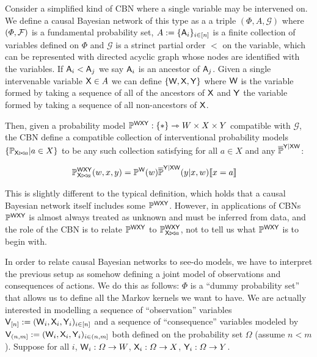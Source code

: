 Consider a simplified kind of CBN where a single variable may be intervened on. We define a causal Bayesian network of this type as a a triple $(\Phi,A,\mathcal{G})$ where $(\Phi,\mathcal{F})$ is a fundamental probability set, $A:=\{\mathsf{A}_i\}_{i\in [n]}$ is a finite collection of variables defined on $\Phi$ and $\mathcal{G}$ is a strinct partial order $<$ on the variable, which can be represented with directed acyclic graph whose nodes are identified with the variables. If $\mathsf{A}_i<\mathsf{A}_j$ we say $\mathsf{A}_i$ is an ancestor of $\mathsf{A}_j$. Given a single intervenable variable $\mathsf{X}\in A$ we can define $\{\mathsf{W},\mathsf{X},\mathsf{Y}\}$ where $\mathsf{W}$ is the variable formed by taking a sequence of all of the ancestors of $\mathsf{X}$ and $\mathsf{Y}$ the variable formed by taking a sequence of all non-ancestors of $\mathsf{X}$.

Then, given a probability model $\mathbb{P}^{\mathsf{WXY}}:\{*\}\rightarrowtriangle W\times X\times Y$ compatible with $\mathcal{G}$, the CBN define a compatible collection of interventional probability models $\{\mathbb{P}_{\mathsf{X}\bowtie a}|a\in X\}$ to be any such collection satisfying for all $a\in X$ and any $\overline{\mathbb{P}}^{\mathsf{Y}|\mathsf{XW}}$:

\begin{align}
    \mathbb{P}_{\mathsf{X}\bowtie a}^{\mathsf{W}\mathsf{X}\mathsf{Y}}(w,x,y) &= \mathbb{P}^{\mathsf{W}}(w)\overline{\mathbb{P}}^{\mathsf{Y}|\mathsf{XW}}(y|x,w)\llbracket x=a \rrbracket\label{eq:truncated_fac2}
\end{align}

This is slightly different to the typical definition, which holds that a causal Bayesian network itself includes some $\mathbb{P}^{\mathsf{WXY}}$. However, in applications of CBNs $\mathbb{P}^{\mathsf{WXY}}$ is almost always treated as unknown and must be inferred from data, and the role of the CBN is to relate $\mathbb{P}^{\mathsf{WXY}}$ to $\mathbb{P}_{\mathsf{X}\bowtie a}^{\mathsf{W}\mathsf{X}\mathsf{Y}}$, not to tell us what $\mathbb{P}^{\mathsf{WXY}}$ is to begin with.

In order to relate causal Bayesian networks to see-do models, we have to interpret the previous setup as somehow defining a joint model of observations and consequences of actions. We do this as follows: $\Phi$ is a ``dummy probability set'' that allows us to define all the Markov kernels we want to have. We are actually interested in modelling a sequence of ``observation'' variables $\mathsf{V}_{[n]}:=(\mathsf{W}_i,\mathsf{X}_i,\mathsf{Y}_i)_{i\in [n]}$ and a sequence of ``consequence'' variables modeled by $\mathsf{V}_{(n,m]}:=(\mathsf{W}_i,\mathsf{X}_i,\mathsf{Y}_i)_{i\in (n,m]}$ both defined on the probability set $\Omega$ (assume $n<m$). Suppose for all $i$, $\mathsf{W}_i:\Omega\to W$, $\mathsf{X}_i:\Omega\to X$, $\mathsf{Y}_i:\Omega\to Y$.


